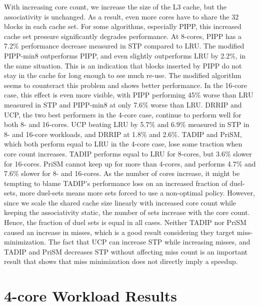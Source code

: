 With increasing core count, we increase the size of the L3 cache, but the associativity is unchanged.
As a result, even more cores have to share the 32 blocks in each cache set.
For some algorithms, especially PIPP, this increased cache set pressure significantly degrades performance.
At 8-cores, PIPP has a 7.2\% performance decrease measured in STP compared to LRU.
The modified PIPP-min8 outperforms PIPP, and even slightly outperforms LRU by 2.2\%, in the same situation.
This is an indication that blocks inserted by PIPP do not stay in the cache for long enough to see much re-use.
The modified algorithm seems to counteract this problem and shows better performance.
In the 16-core case, this effect is even more visible, with PIPP performing 45\% worse than LRU measured in STP and PIPP-min8 at only 7.6\% worse than LRU.
DRRIP and UCP, the two best performers in the 4-core case, continue to perform well for both 8- and 16-cores.
UCP beating LRU by 5.7\% and 6.9\% measured in STP in 8- and 16-core workloads, and DRRIP at 1.8\% and 2.6\%.
TADIP and PriSM, which both perform equal to LRU in the 4-core case, lose some traction when core count increases.
TADIP performs equal to LRU for 8-cores, but 3.6\% slower for 16-cores.
PriSM cannot keep up for more than 4-cores, and performs 4.7\% and 7.6\% slower for 8- and 16-cores.
As the number of cores increase, it might be tempting to blame TADIP's performance loss on an increased fraction of duel-sets, more duel-sets means more sets forced to use a non-optimal policy.
However, since we scale the shared cache size linearly with increased core count while keeping the associativity static, the number of sets increase with the core count.
Hence, the fraction of duel sets is equal in all cases.
Neither TADIP nor PriSM caused an increase in misses, which is a good result considering they target miss-minimization.
The fact that UCP can increase STP while increasing misses, and TADIP and PriSM decreases STP without affecting miss count is an important result that shows that miss minimization does not directly imply a speedup.

\section{4-core Workload Results}

